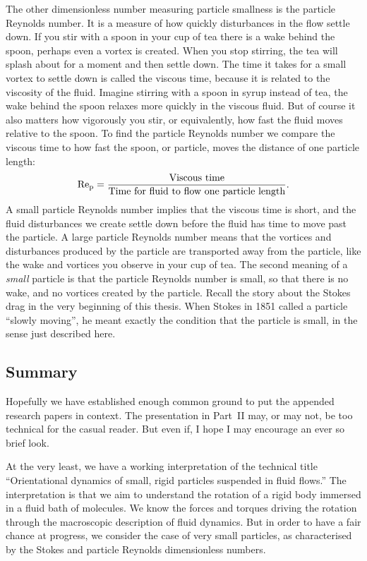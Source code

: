 \documentclass[thesis.tex]{subfiles}
\begin{document}
The other dimensionless number measuring particle smallness is the particle Reynolds number. It is a measure of how quickly disturbances in the flow settle down. If you stir with a spoon in your cup of tea there is a wake behind the spoon, perhaps even a vortex is created. When you stop stirring, the tea will splash about for a moment and then settle down. The time it takes for a small vortex to settle down is called the viscous time, because it is related to the viscosity of the fluid. Imagine stirring with a spoon in syrup instead of tea, the wake behind the spoon relaxes more quickly in the viscous fluid. But of course it also matters how vigorously you stir, or equivalently, how fast the fluid moves relative to the spoon. To find the particle Reynolds number we compare the viscous time to how fast the spoon, or particle, moves the distance of one particle length:
\begin{align*}
 	\mbox{Re}_{\mathrm p} = \frac{\textrm{Viscous time}}{\textrm{Time for fluid to flow one particle length}}.
 \end{align*} 
A small particle Reynolds number implies that the viscous time is short, and the fluid disturbances we create settle down before the fluid has time to move past the particle. A large particle Reynolds number means that the vortices and disturbances produced by the particle are transported away from the particle, like the wake and vortices you observe in your cup of tea. The second meaning of a \emph{small} particle is that the particle Reynolds number is small, so that there is no wake, and no vortices created by the particle. 
Recall the story about the Stokes drag in the very beginning of this thesis. When Stokes in 1851 called a particle ``slowly moving'', he meant exactly the condition that the particle is small, in the sense just described here.

\subsection*{Summary}

Hopefully we have established enough common ground to put the appended research papers in context. The presentation in Part~II may, or may not, be too technical for the casual reader. But even if, I hope I may encourage an ever so brief look.

At the very least, we have a working interpretation of the technical title ``Orientational dynamics of small, rigid particles suspended in fluid flows.'' The interpretation is that we aim to understand the rotation of a rigid body immersed in a fluid bath of molecules. We know the forces and torques driving the rotation through the macroscopic description of fluid dynamics. But in order to have a fair chance at progress, we consider the case of very small particles, as characterised by the Stokes and particle Reynolds dimensionless numbers.
\end{document}
